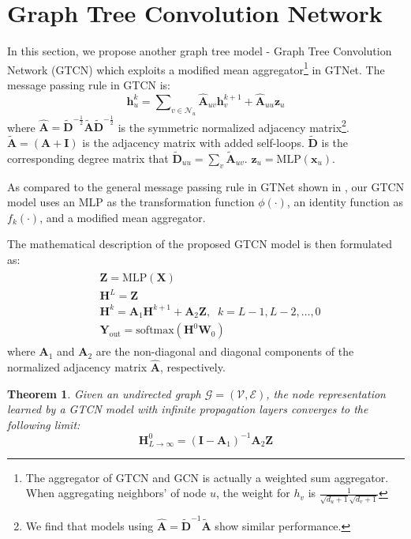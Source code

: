 \documentclass[lettersize,journal]{IEEEtran}
\theoremstyle{plain}
\newtheorem{theorem}{Theorem}
\theoremstyle{definition}
\theoremstyle{remark}
\begin{document}
\section{Graph Tree Convolution Network}
\label{GTCN}
In this section, we propose another graph tree model - Graph Tree Convolution Network (GTCN) which exploits a modified mean aggregator\footnote{The aggregator of GTCN and GCN is actually a weighted sum aggregator. When aggregating neighbors' of node $u$, the weight for $h_v$ is $\frac{1}{\sqrt{d_u +1} \sqrt{d_v + 1}}$} in GTNet. The message passing rule in GTCN is:
\begin{equation}
	\label{eqn:gtcn_node}
	\bm{h}_u^k = \sum\nolimits_{v\in \mathcal{N}_u}{\hat{\bm{A}}_{uv} \bm{h}_v^{k+1}} + \hat{\bm{A}}_{uu} \bm{z}_u
\end{equation}
where $\hat{\bm{A}} = \tilde{\bm{D}}^{-\frac{1}{2}} \tilde{\bm{A}} \tilde{\bm{D}}^{-\frac{1}{2}}$ is the symmetric normalized adjacency matrix\footnote{We find that models using $\hat{\bm{A}} = \tilde{\bm{D}}^{-1}\tilde{\bm{A}}$ show similar performance.}. $\tilde{\bm{A}} = \left(\bm{A} + \bm{I}\right)$ is the adjacency matrix with added self-loops. $\tilde{\bm{D}}$ is the corresponding degree matrix that $\tilde{\bm{D}}_{uu} = \sum\nolimits_v \tilde{\bm{A}}_{uv}$. $\bm{z}_u = \text{MLP}(\bm{x}_u)$.

As compared to the general message passing rule in GTNet shown in , our GTCN model uses an MLP as the transformation function $\phi(\cdot)$, an identity function as $f_k(\cdot)$, and a modified mean aggregator.

The mathematical description of the proposed GTCN model is then formulated as:
\begin{align}
	\label{eqn:GTCN}
	\begin{split}
		&\bm{Z} =   \text{MLP}\left( \bm{X} \right) \\
		&\bm{H}^L = \bm{Z} \\
		&\bm{H}^k = \bm{A}_1 \bm{H}^{k+1} + \bm{A}_2 \bm{Z}, \; \; k = L-1, L-2, \ldots, 0 \\
		&\bm{Y}_{\text{out}} = \text{softmax}\left(\bm{H}^0 \bm{W}_0\right)
	\end{split}
\end{align}
where $\bm{A}_1$ and $\bm{A}_2$ are the non-diagonal and diagonal components of the normalized adjacency matrix $\hat{\bm{A}}$, respectively.

\begin{theorem}
\label{thm:deep}
	Given an undirected graph $\mathcal{G}=(\mathcal{V,E})$, the node representation learned by a GTCN model with infinite propagation layers converges to the following limit:
	\begin{equation}
		\bm{H}^0_{L \to \infty} = \left(\bm{I} - \bm{A}_1\right)^{-1} \bm{A}_2 \bm{Z}
	\end{equation}
\end{theorem}
\end{document}
